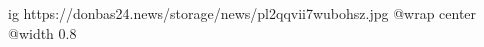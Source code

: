  
 
 
 
 

\ifcmt
  ig https://donbas24.news/storage/news/pl2qqvii7wubohsz.jpg
  @wrap center
  @width 0.8
\fi
